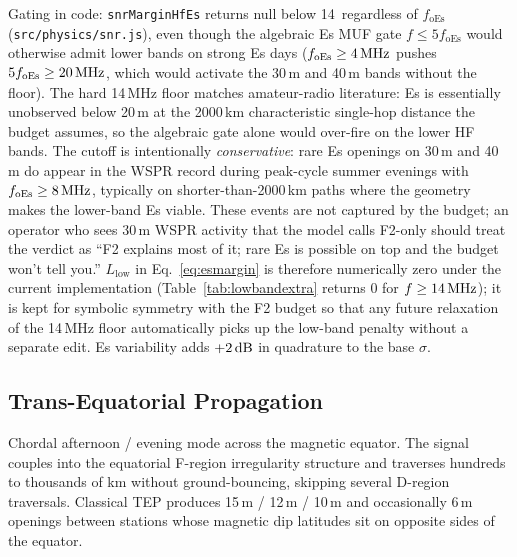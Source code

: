 \documentclass[11pt,a4paper]{article}
\newcommand{\SI}[2]{#1\,\text{#2}}
\newcommand{\dB}{\text{dB}}
\newcommand{\MHz}{\text{MHz}}
\begin{document}
Gating in code: \texttt{snrMarginHfEs} returns null below
\SI{14}{\MHz} regardless of $f_{\text{oEs}}$
(\texttt{src/physics/snr.js}), even though the algebraic Es MUF
gate $f \le 5 f_{\text{oEs}}$ would otherwise admit lower bands
on strong Es days ($f_{\text{oEs}} \ge \SI{4}{\MHz}$ pushes
$5 f_{\text{oEs}} \ge \SI{20}{\MHz}$, which would activate the
30\,m and 40\,m bands without the floor).  The hard 14\,MHz floor
matches amateur-radio literature: Es is essentially unobserved
below 20\,m at the 2000\,km characteristic single-hop distance
the budget assumes, so the algebraic gate alone would over-fire
on the lower HF bands.  The cutoff is intentionally
\emph{conservative}: rare Es openings on 30\,m and 40\,m do
appear in the WSPR record during peak-cycle summer evenings with
$f_{\text{oEs}} \ge \SI{8}{\MHz}$, typically on shorter-than-2000\,km
paths where the geometry makes the lower-band Es viable.  These
events are not captured by the budget; an operator who sees
30\,m WSPR activity that the model calls F2-only should treat the
verdict as ``F2 explains most of it; rare Es is possible on top
and the budget won't tell you.''  $L_{\text{low}}$ in
Eq.~\ref{eq:esmargin} is therefore numerically zero under the
current implementation (Table~\ref{tab:lowbandextra} returns 0
for $f \ge \SI{14}{\MHz}$); it is kept for symbolic symmetry with
the F2 budget so that any future relaxation of the 14\,MHz floor
automatically picks up the low-band penalty without a separate
edit.  Es variability adds $\SI{+2}{\dB}$ in quadrature to the
base $\sigma$.

\subsection{Trans-Equatorial Propagation}\label{sec:tep}

Chordal afternoon / evening mode across the magnetic equator.  The
signal couples into the equatorial F-region irregularity structure
and traverses hundreds to thousands of km without ground-bouncing,
skipping several D-region traversals.  Classical TEP produces 15\,m
/ 12\,m / 10\,m and occasionally 6\,m openings between stations whose
magnetic dip latitudes sit on opposite sides of the equator.
\end{document}
